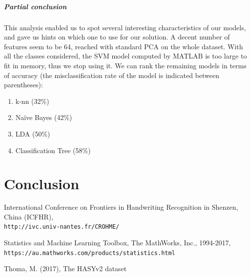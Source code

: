 \documentclass[twocolumn]{article}%
\begin{document}
	\subparagraph{Partial conclusion}
	This analysis enabled us to spot several interesting characteristics of our models, and gave us hints on which one to use for our solution. A decent number of features seem to be 64, reached with standard PCA on the whole dataset. With all the classes considered, the SVM model computed by MATLAB is too large to fit in memory, thus we stop using it. We can rank the remaining models in terms of accuracy (the misclassification rate of the model is indicated between parentheses):
	\begin{enumerate}
	\item k-nn (32\%)
	\item Naïve Bayes (42\%)
	\item LDA (50\%)
	\item Classification Tree (58\%)
	\end{enumerate}
	
		
	
	\section{Conclusion}
	
	\begin{thebibliography}{9}
		International Conference on Frontiers in Handwriting Recognition in Shenzen, China (ICFHR),
		\\\texttt{http://ivc.univ-nantes.fr/CROHME/}
		
		Statistics and Machine Learning Toolbox, The MathWorks, Inc., 1994-2017,
		\\\texttt{https://au.mathworks.com/products/statistics.html}
		
		Thoma, M. (2017), The HASYv2 dataset
		
		
	\end{thebibliography}
\end{document}
